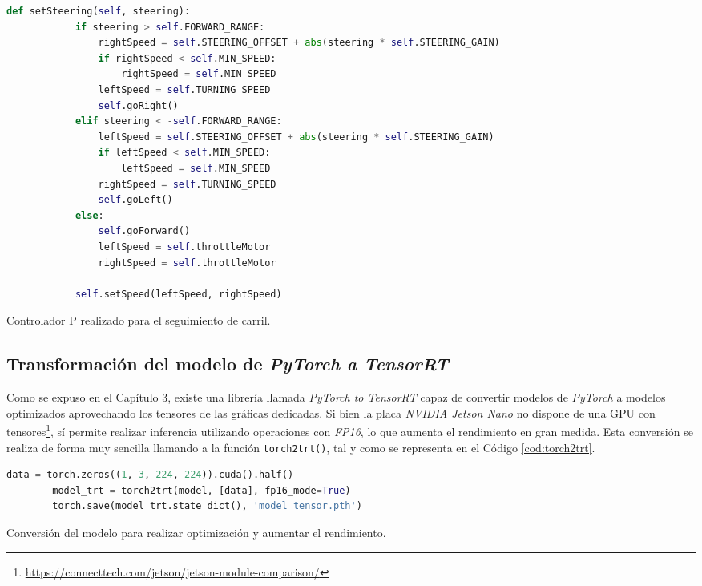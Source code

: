 \begin{code}[h]
	\begin{lstlisting}[language=Python]
		def setSteering(self, steering):
			if steering > self.FORWARD_RANGE:
				rightSpeed = self.STEERING_OFFSET + abs(steering * self.STEERING_GAIN)
				if rightSpeed < self.MIN_SPEED:
					rightSpeed = self.MIN_SPEED
				leftSpeed = self.TURNING_SPEED
				self.goRight()
			elif steering < -self.FORWARD_RANGE:
				leftSpeed = self.STEERING_OFFSET + abs(steering * self.STEERING_GAIN)
				if leftSpeed < self.MIN_SPEED:
					leftSpeed = self.MIN_SPEED
				rightSpeed = self.TURNING_SPEED
				self.goLeft()
			else:
				self.goForward()
				leftSpeed = self.throttleMotor
				rightSpeed = self.throttleMotor
			
			self.setSpeed(leftSpeed, rightSpeed)
	\end{lstlisting}
	\caption[Controlador P realizado para el seguimiento de carril.]{Controlador P realizado para el seguimiento de carril.}
	\label{cod:controller}
\end{code}

\subsection{Transformación del modelo de \textit{PyTorch a TensorRT}}
Como se expuso en el Capítulo 3, existe una librería llamada \textit{PyTorch to TensorRT} capaz de convertir modelos de \textit{PyTorch} a modelos optimizados aprovechando los tensores de las gráficas dedicadas. Si bien la placa \textit{NVIDIA Jetson Nano} no dispone de una GPU con tensores\footnote{\url{https://connecttech.com/jetson/jetson-module-comparison/}}, sí permite realizar inferencia utilizando operaciones con \textit{FP16}, lo que aumenta el rendimiento en gran medida. Esta conversión se realiza de forma muy sencilla llamando a la función \verb|torch2trt()|, tal y como se representa en el Código \ref{cod:torch2trt}.\\

\begin{code}[h]
	\begin{lstlisting}[language=Python]
		data = torch.zeros((1, 3, 224, 224)).cuda().half()
		model_trt = torch2trt(model, [data], fp16_mode=True)
		torch.save(model_trt.state_dict(), 'model_tensor.pth')
	\end{lstlisting}
	\caption[Conversión del modelo para realizar optimización y aumentar el rendimiento.]{Conversión del modelo para realizar optimización y aumentar el rendimiento.}
	\label{cod:torch2trt}
\end{code}

